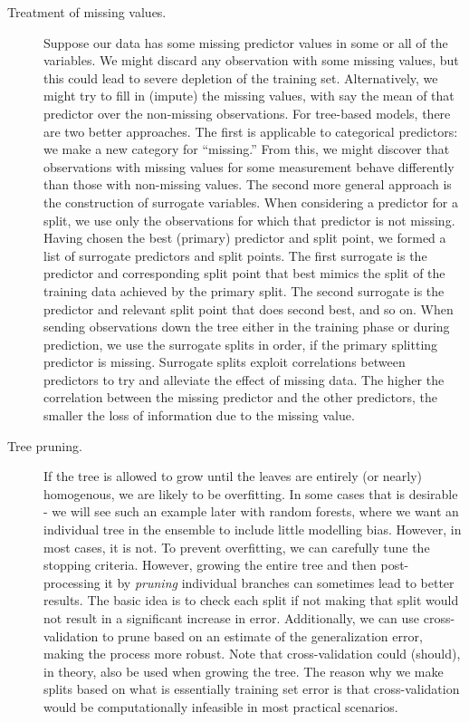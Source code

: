 \begin{refsection}
\begin{description}
\item[Treatment of missing values.] Suppose our data has some missing predictor values in some or all of the variables. We might discard any observation with some missing values, but this could lead to severe depletion of the training set. Alternatively, we might try to fill in (impute) the missing values, with say the mean of that predictor over the non-missing observations. For tree-based models, there are two better approaches. The first is applicable to categorical predictors: we make a new category for “missing.” From this, we might discover that observations with missing values for some measurement behave differently than those with non-missing values. The second more general approach is the construction of surrogate variables. When considering a predictor for a split, we use only the observations for which that predictor is not missing. Having chosen the best (primary) predictor and split point, we formed a list of surrogate predictors and split points. The first surrogate is the predictor and corresponding split point that best mimics the split of the training data achieved by the primary split. The second surrogate is the predictor and relevant split point that does second best, and so on. When sending observations down the tree either in the training phase or during prediction, we use the surrogate splits in order, if the primary splitting predictor is missing. Surrogate splits exploit correlations between predictors to try and alleviate the effect of missing data. The higher the correlation between the missing predictor and the other predictors, the smaller the loss of information due to the missing value.

\item[Tree pruning.] If the tree is allowed to grow until the leaves are entirely (or nearly) homogenous, we are likely to be overfitting. In some cases that is desirable - we will see such an example later with random forests, where we want an individual tree in the ensemble to include little modelling bias. However, in most cases, it is not. To prevent overfitting, we can carefully tune the stopping criteria. However, growing the entire tree and then post-processing it by {\em pruning} individual branches can sometimes lead to better results. The basic idea is to check each split if not making that split would not result in a significant increase in error.
Additionally, we can use cross-validation to prune based on an estimate of the generalization error, making the process more robust. Note that cross-validation could (should), in theory, also be used when growing the tree. The reason why we make splits based on what is essentially training set error is that cross-validation would be computationally infeasible in most practical scenarios. 


\end{description}
\end{refsection}
